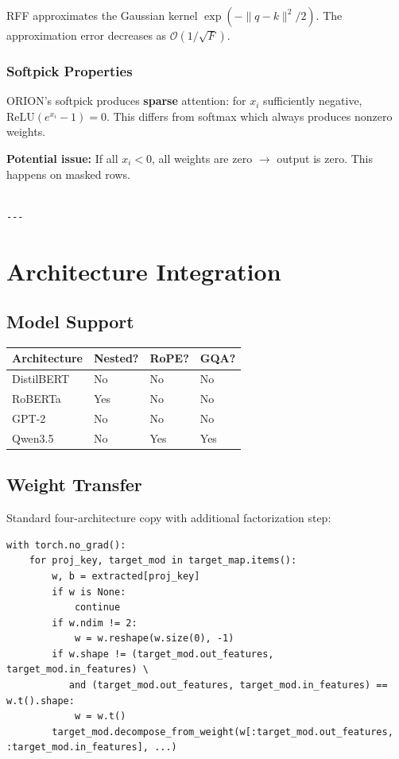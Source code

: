 RFF approximates the Gaussian kernel $\exp(-\|q - k\|^2 / 2)$. The 
approximation error decreases as $\mathcal{O}(1/\sqrt{F})$.

\subsubsection{Softpick Properties}

ORION's softpick produces \textbf{sparse} attention: for $x_i$ sufficiently 
negative, $\text{ReLU}(e^{x_i} - 1) = 0$. This differs from softmax which 
always produces nonzero weights.

\textbf{Potential issue:} If all $x_i < 0$, all weights are zero $\to$ output is 
zero. This happens on masked rows.
\begin{lstlisting}

---
\end{lstlisting}


\section{Architecture Integration}

\subsection{Model Support}

\begin{table}[H]
\centering
\small
\begin{tabular}{llll}
\toprule
\textbf{Architecture} & \textbf{Nested?} & \textbf{RoPE?} & \textbf{GQA?} \\
\midrule
DistilBERT & No & No & No \\
RoBERTa & Yes & No & No \\
GPT-2 & No & No & No \\
Qwen3.5 & No & Yes & Yes \\
\bottomrule
\end{tabular}
\end{table}

\subsection{Weight Transfer}

Standard four-architecture copy with additional factorization step:

\begin{lstlisting}
with torch.no_grad():
    for proj_key, target_mod in target_map.items():
        w, b = extracted[proj_key]
        if w is None:
            continue
        if w.ndim != 2:
            w = w.reshape(w.size(0), -1)
        if w.shape != (target_mod.out_features, target_mod.in_features) \
           and (target_mod.out_features, target_mod.in_features) == w.t().shape:
            w = w.t()
        target_mod.decompose_from_weight(w[:target_mod.out_features, :target_mod.in_features], ...)
\end{lstlisting}

